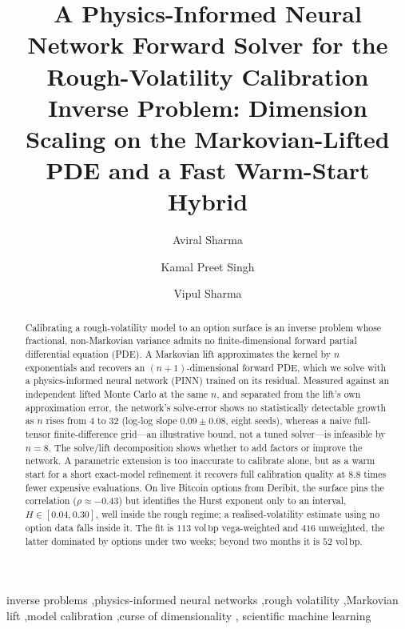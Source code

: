 \documentclass[preprint,12pt]{elsarticle}
\newcommand{\bp}{\ensuremath{\,\mathrm{bp}}}
\begin{document}
\begin{frontmatter}

\title{A Physics-Informed Neural Network Forward Solver for the Rough-Volatility
Calibration Inverse Problem: Dimension Scaling on the Markovian-Lifted PDE and a
Fast Warm-Start Hybrid}

\author[cu]{Aviral Sharma}
\author[sgt]{Kamal Preet Singh}
\author[ind]{Vipul Sharma}



\begin{abstract}
Calibrating a rough-volatility model to an option surface is an inverse problem
whose fractional, non-Markovian variance admits no finite-dimensional forward
partial differential equation (PDE). A Markovian lift approximates the kernel by
$n$ exponentials and recovers an $(n{+}1)$-dimensional forward PDE, which we
solve with a physics-informed neural network (PINN) trained on its residual.
Measured against an independent lifted Monte Carlo at the same $n$, and separated
from the lift's own approximation error, the network's solve-error shows no
statistically detectable growth as $n$ rises from 4 to 32 (log-log slope
$0.09\pm0.08$, eight seeds), whereas a naive full-tensor finite-difference
grid---an illustrative bound, not a tuned solver---is infeasible by $n{=}8$. The
solve/lift decomposition shows whether to add factors or improve the network. A
parametric extension is too inaccurate to calibrate alone, but as a warm start
for a short exact-model refinement it recovers full calibration quality at $8.8$
times fewer expensive evaluations. On live Bitcoin options from Deribit, the
surface pins the correlation ($\rho\approx-0.43$) but identifies the Hurst
exponent only to an interval, $H\in[0.04,0.30]$, well inside the rough regime; a
realised-volatility estimate using no option data falls inside it. The fit is
$113$ vol\bp{} vega-weighted and $416$ unweighted, the latter dominated by
options under two weeks; beyond two months it is $52$ vol\bp{}.
\end{abstract}

\begin{keyword}
inverse problems \sep physics-informed neural networks \sep rough volatility
\sep Markovian lift \sep model calibration \sep curse of dimensionality \sep
scientific machine learning
\end{keyword}

\end{frontmatter}
\end{document}

